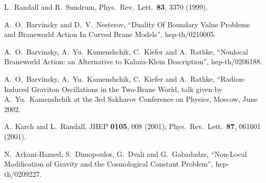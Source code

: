 \documentclass[a4paper,12pt]{article}
\begin{document}
\begin{thebibliography}{9}
 L.~Randall and R.~Sundrum,
Phys.\ Rev.\ Lett.\  {\bf 83}, 3370 (1999).

 A.~O.~Barvinsky and D.~V.~Nesterov,
``Duality Of Boundary Value Problems and Braneworld Action In
Curved Brane Models'', hep-th/0210005.

 A.~O.~Barvinsky, A.~Yu.~Kamenshchik, C.~Kiefer
and A.~Rathke, ``Nonlocal Braneworld Action: an Alternative
to Kaluza-Klein Description'', hep-th/0206188.

 A.~O.~Barvinsky, A.~Yu.~Kamenshchik, C.~Kiefer
and A.~Rathke, ``Radion-Induced Graviton Oscillations in the
Two-Brane World, talk given by A.~Yu.~Kamenshchik at the 3rd
Sakharov Conference on Physics, Moscow, June 2002.

 A.~Karch and L.~Randall, JHEP {\bf 0105},
008 (2001); Phys.\ Rev.\ Lett.\ {\bf 87}, 061601 (2001).

 N.~Arkani-Hamed, S.~Dimopoulos, G.~Dvali and
G.~Gabadadze, ``Non-Local Modification of Gravity and the
Cosmological Constant Problem'', hep-th/0209227.

\end{thebibliography}
\end{document}
